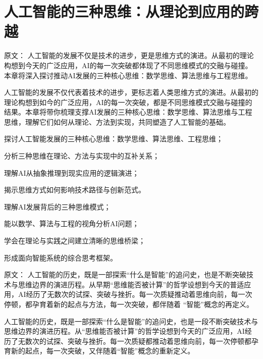 \chapter{人工智能的三种思维：从理论到应用的跨越}

原文：
人工智能的发展不仅是技术的进步，更是思维方式的演进。从最初的理论构想到今天的广泛应用，AI的每一次突破都体现了不同思维模式的交融与碰撞。本章将深入探讨推动AI发展的三种核心思维：数学思维、算法思维与工程思维。

人工智能的发展不仅代表着技术的进步，更标志着人类思维方式的演进。从最初的理论构想到如今的广泛应用，AI的每一次突破，都是不同思维模式交融与碰撞的结果。本章将带你梳理支撑AI发展的三种核心思维：数学思维、算法思维与工程思维，理解它们如何从理论、方法到实现，共同塑造了人工智能的基础。

\begin{introduction}
  \item 探讨人工智能发展的三种核心思维：数学思维、算法思维、工程思维；
  \item 分析三种思维在理论、方法与实现中的互补关系；
  \item 理解AI从抽象推理到现实应用的逻辑演进；
  \item 揭示思维方式如何影响技术路径与创新范式。
\end{introduction}

\begin{introduction}
  \item 理解AI发展背后的三种思维模式；
  \item 能以数学、算法与工程的视角分析AI问题；
  \item 学会在理论与实践之间建立清晰的思维桥梁；
  \item 形成面向智能系统的综合思考框架。
\end{introduction}

原文：
人工智能的历史，既是一部探索“什么是智能”的追问史，也是不断突破技术与思维边界的演进历程。从早期“思维能否被计算”的哲学设想到今天的普适应用，AI经历了无数次的试探、突破与挫折。每一次质疑推动着思维向前，每一次停顿，都孕育着新的起点与方法，每一次突破，都伴随着 “智能”概念的再定义。

人工智能的历史，既是一部探索“什么是智能”的追问史，也是一段不断突破技术与思维边界的演进历程。从“思维能否被计算”的哲学设想到今天的广泛应用，AI经历了无数次的试探、突破与挫折。每一次质疑都推动着思维向前，每一次停顿都孕育新的起点，每一次突破，又伴随着“智能”概念的重新定义。

